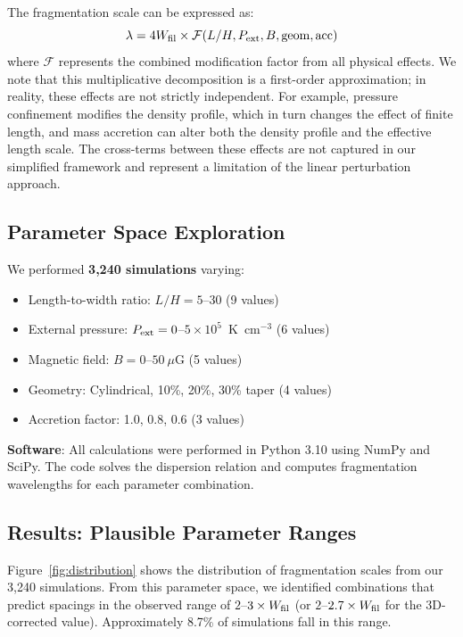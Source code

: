 \documentclass[11pt,a4paper]{article}
\begin{document}
The fragmentation scale can be expressed as:
\begin{equation}
\lambda = 4W_{\rm fil} \times \mathcal{F}(L/H, P_{\rm ext}, B, {\rm geom}, {\rm acc})
\end{equation}
where $\mathcal{F}$ represents the combined modification factor from all physical effects. We note that this multiplicative decomposition is a first-order approximation; in reality, these effects are not strictly independent. For example, pressure confinement modifies the density profile, which in turn changes the effect of finite length, and mass accretion can alter both the density profile and the effective length scale. The cross-terms between these effects are not captured in our simplified framework and represent a limitation of the linear perturbation approach.

\subsection{Parameter Space Exploration}

We performed \textbf{3,240 simulations} varying:
\begin{itemize}
    \item Length-to-width ratio: $L/H = 5$--$30$ (9 values)
    \item External pressure: $P_{\rm ext} = 0$--$5 \times 10^5$~K~cm$^{-3}$ (6 values)
    \item Magnetic field: $B = 0$--$50~\mu$G (5 values)
    \item Geometry: Cylindrical, 10\%, 20\%, 30\% taper (4 values)
    \item Accretion factor: 1.0, 0.8, 0.6 (3 values)
\end{itemize}

\textbf{Software}: All calculations were performed in Python 3.10 using NumPy and SciPy. The code solves the dispersion relation and computes fragmentation wavelengths for each parameter combination.

\subsection{Results: Plausible Parameter Ranges}

Figure~\ref{fig:distribution} shows the distribution of fragmentation scales from our 3,240 simulations. From this parameter space, we identified combinations that predict spacings in the observed range of $2$--$3\times W_{\rm fil}$ (or $2$--$2.7\times W_{\rm fil}$ for the 3D-corrected value). Approximately 8.7\% of simulations fall in this range.
\end{document}
